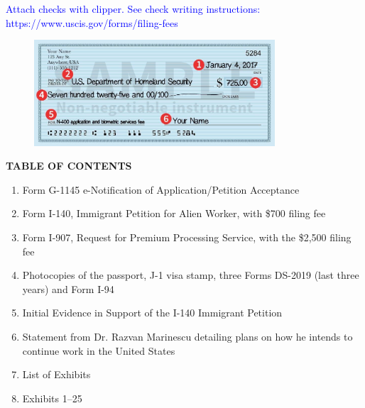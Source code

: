 \documentclass[11pt]{article}
\title{}
\date{}
\begin{document}
\newcommand{\tc}[1]{\textcolor{blue}{#1}}



\tc{Attach checks with clipper. See check writing instructions: https://www.uscis.gov/forms/filing-fees}

\begin{figure}
\includegraphics[width=0.8\textwidth]{ref/check.jpeg}
\end{figure}

\vspace*{5em}



\begin{center}
\Large{\textbf{TABLE OF CONTENTS}} 
\end{center}



\begin{enumerate}
 \item Form G-1145 e-Notification of Application/Petition Acceptance
 \item Form I-140, Immigrant Petition for Alien Worker, with \$700 filing fee
 \item Form I-907, Request for Premium Processing Service, with the \$2,500 filing fee
 \item Photocopies of the passport, J-1 visa stamp, three Forms DS-2019 (last three years) and Form I-94
 \item Initial Evidence in Support of the I-140 Immigrant Petition
 \item Statement from Dr. Razvan Marinescu detailing plans on how he intends to continue work in the United States
 \item List of Exhibits
 \item Exhibits 1--25
\end{enumerate}


\pagebreak


\end{document}
